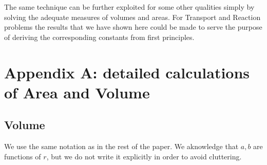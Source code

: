 \documentclass[letterpaper,10pt, jcp, aps]{revtex4-1}
\begin{document}
The same technique can be further exploited for some other
qualities simply by solving the adequate measures
of volumes and areas. For Transport and Reaction problems
the results that we have shown here could be made to serve
the purpose of deriving the corresponding constants from first
principles.


\section{Appendix A: detailed calculations of Area and Volume}

\subsection{Volume}\label{VolApen}

We use the same notation as in the rest of the paper.
We aknowledge that $a,b$ are functions of $r$, but we do not write
it explicitly in order to avoid cluttering.
\end{document}
